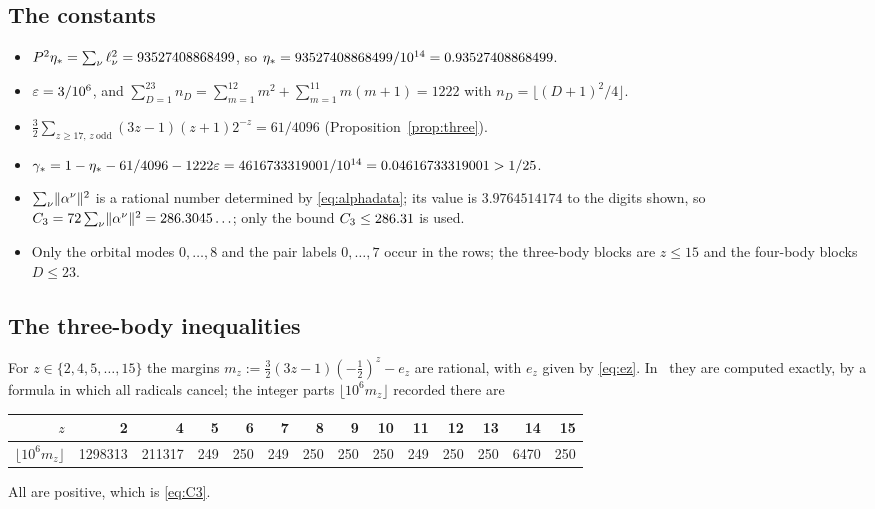 \subsection{The constants}

\begin{itemize}
\item $P^2\eta_{*}=\sum_\nu\ell_\nu^2=93527408868499$, so $\eta_{*}=93527408868499/10^{14}=0.93527408868499$.
\item $\varepsilon=3/10^6$, and $\sum_{D=1}^{23}n_D=\sum_{m=1}^{12}m^2+\sum_{m=1}^{11}m(m+1)=1222$ with $n_D=\lfloor(D+1)^2/4\rfloor$.
\item $\frac32\sum_{z\ge17,\,z\ \mathrm{odd}}(3z-1)(z+1)2^{-z}=61/4096$ (Proposition~\ref{prop:three}).
\item $\gamma_{*}=1-\eta_{*}-61/4096-1222\varepsilon=4616733319001/10^{14}=0.04616733319001>1/25$.
\item $\sum_\nu\lVert\alpha^\nu\rVert^2$ is a rational number determined by \eqref{eq:alphadata}; its value is $3.9764514174$ to the digits
shown, so $C_{3}=72\sum_\nu\lVert\alpha^\nu\rVert^2=286.3045\ldots$; only the bound $C_{3}\le286.31$ is used.
\item Only the orbital modes $0,\dots,8$ and the pair labels $0,\dots,7$ occur in the rows; the three-body blocks are $z\le15$ and the
four-body blocks $D\le23$.
\end{itemize}

\subsection{The three-body inequalities}

For $z\in\{2,4,5,\dots,15\}$ the margins $m_z:=\frac32(3z-1)(-\frac12)^z-e_z$ are rational, with $e_z$ given by \eqref{eq:ez}.
In~\cite[Appendix~A.2]{OAI:A-Fock-space-inequality-and-the-Laughlin-spectral-gap-September-24-2026} they are computed exactly,
by a formula in which all radicals cancel; the integer parts $\lfloor10^6m_z\rfloor$ recorded there are
\begin{center}
\setlength{\tabcolsep}{4pt}\begin{tabular}{rrrrrrrrrrrrrr}
\toprule
$z$&2&4&5&6&7&8&9&10&11&12&13&14&15\\
\midrule
$\lfloor10^6m_z\rfloor$&1298313&211317&249&250&249&250&250&250&249&250&250&6470&250\\
\bottomrule
\end{tabular}
\end{center}
All are positive, which is \eqref{eq:C3}.

